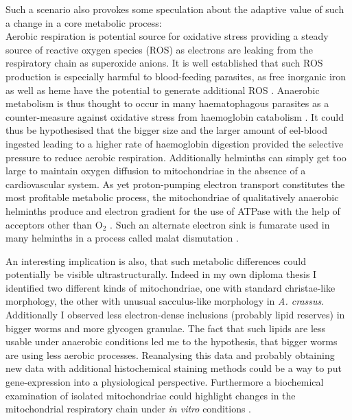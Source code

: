 Such a scenario also provokes some speculation about the adaptive
value of such a change in a core metabolic process:\\
Aerobic respiration is potential source for oxidative stress providing
a steady source of reactive oxygen species (ROS) as electrons are
leaking from the respiratory chain as superoxide anions. It is well
established that such ROS production is especially harmful to
blood-feeding parasites, as free inorganic iron as well as heme have
the potential to generate additional ROS
\cite{pmid21087517}. Anaerobic metabolism is thus thought to occur in
many haematophagous parasites as a counter-measure against oxidative
stress from haemoglobin catabolism \cite{pmid12163151}. It could thus
be hypothesised that the bigger size and the larger amount of
eel-blood ingested leading to a higher rate of haemoglobin digestion
provided the selective pressure to reduce aerobic
respiration. Additionally helminths can simply get too large to
maintain oxygen diffusion to mitochondriae in the absence of a
cardiovascular system. As yet proton-pumping electron transport
constitutes the most profitable metabolic process, the mitochondriae of
qualitatively anaerobic helminths produce and electron gradient for
the use of ATPase with the help of acceptors other than O$_2$
\cite{pmid12417132}. Such an alternate electron sink is fumarate used
in many helminths in a process called malat dismutation
\cite{pmid15275412}.

An interesting implication is also, that such metabolic differences
could potentially be visible ultrastructurally. Indeed in my own
diploma thesis \cite{heitlinger_vergleichende_2008} I identified two
different kinds of mitochondriae, one with standard christae-like
morphology, the other with unusual sacculus-like morphology in
\textit{A. crassus}. Additionally I observed less electron-dense
inclusions (probably lipid reserves) in bigger worms and more glycogen
granulae. The fact that such lipids are less usable under anaerobic
conditions led me to the hypothesis, that bigger worms are using less
aerobic processes. Reanalysing this data and probably obtaining new
data with additional histochemical staining methods could be a way to
put gene-expression into a physiological perspective. Furthermore a
biochemical examination of isolated mitochondriae could highlight
changes in the mitochondrial respiratory chain under \textit{in vitro}
conditions \cite{pmid18314717}.

